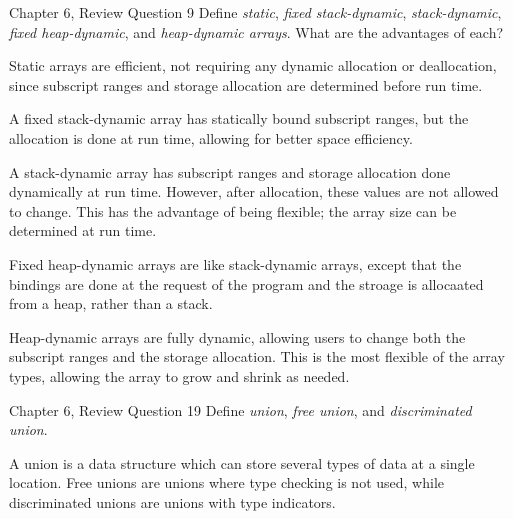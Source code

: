 \documentclass[11pt]{article}
\begin{document}
\begin{ps}
\begin{problemcit}{Chapter 6, Review Question 9}
Define \emph{static}, \emph{fixed stack-dynamic}, \emph{stack-dynamic}, \emph{fixed heap-dynamic}, and \emph{heap-dynamic arrays}. What are the advantages of each?
\end{problemcit}

\begin{soln}
Static arrays are efficient, not requiring any dynamic allocation or deallocation, since subscript ranges and storage allocation are determined before run time.

A fixed stack-dynamic array has statically bound subscript ranges, but the allocation is done at run time, allowing for better space efficiency.

A stack-dynamic array has subscript ranges and storage allocation done dynamically at run time. However, after allocation, these values are not allowed to change. This has the advantage of being flexible; the array size can be determined at run time.

Fixed heap-dynamic arrays are like stack-dynamic arrays, except that the bindings are done at the request of the program and the stroage is allocaated from a heap, rather than a stack.

Heap-dynamic arrays are fully dynamic, allowing users to change both the subscript ranges and the storage allocation. This is the most flexible of the array types, allowing the array to grow and shrink as needed.
\end{soln}
\end{ps}

\begin{ps}
\begin{problemcit}{Chapter 6, Review Question 19}
Define \emph{union}, \emph{free union}, and \emph{discriminated union}.
\end{problemcit}

\begin{soln}
A union is a data structure which can store several types of data at a single location. Free unions are unions where type checking is not used, while discriminated unions are unions with type indicators.
\end{soln}
\end{ps}
\end{document}
